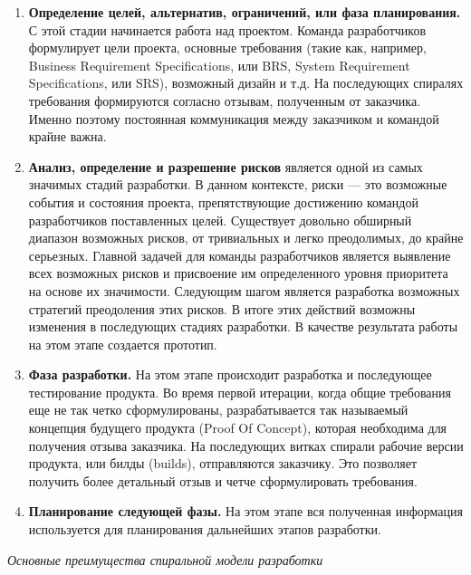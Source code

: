 \documentclass[a4paper,14pt]{extarticle}
\begin{document}
 	\begin{enumerate}
 		\item {\bf Определение целей, альтернатив, ограничений, или фаза планирования.} С этой стадии начинается работа над проектом. Команда разработчиков формулирует цели проекта, основные требования (такие как, например, Business Requirement Specifications, или BRS, System Requirement Specifications, или SRS), возможный дизайн и т.д. На последующих спиралях требования формируются согласно отзывам, полученным от заказчика. Именно поэтому постоянная коммуникация между заказчиком и командой крайне важна.
 		\item {\bf Анализ, определение и разрешение рисков} является одной из самых значимых стадий разработки. В данном контексте,  риски — это возможные события и состояния проекта, препятствующие достижению командой разработчиков поставленных целей. Существует довольно обширный диапазон возможных рисков, от тривиальных и легко преодолимых, до крайне серьезных. Главной задачей для команды разработчиков является выявление всех возможных рисков и присвоение им определенного уровня приоритета на основе их значимости. Следующим шагом является разработка возможных стратегий преодоления этих рисков. В итоге этих действий возможны изменения в последующих стадиях разработки. В качестве результата работы на этом этапе создается прототип.
 		\item {\bf Фаза разработки.} На этом этапе происходит разработка и последующее тестирование продукта. Во время первой итерации, когда общие требования еще не так четко сформулированы, разрабатывается так называемый концепция будущего продукта (Proof Of Concept), которая необходима для получения отзыва заказчика. На последующих витках спирали рабочие версии продукта, или билды (builds), отправляются заказчику. Это позволяет получить более детальный отзыв и четче сформулировать требования.
 		\item {\bf Планирование следующей фазы.} На этом этапе вся полученная информация используется для планирования дальнейших этапов разработки.
 	\end{enumerate}
 	
 	\textit{Основные преимущества спиральной модели разработки}
 	
\end{document}
